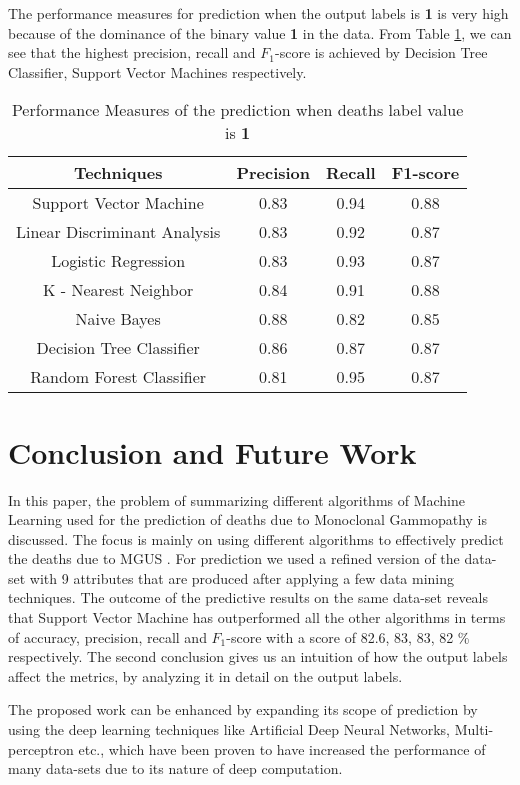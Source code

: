 \documentclass[conference]{IEEEtran}
\begin{document}
The performance measures for prediction when the output labels is \textbf{1} is very high because of the dominance of the binary value \textbf{1} in the data. From Table \ref{table:3}, we can see that the highest precision, recall and $F_1$-score is achieved by Decision Tree Classifier, Support Vector Machines respectively.
\begin{table}[H]
\centering
 \begin{tabular}{|c| c c c|}
 \hline
 Techniques  & Precision & Recall & F1-score \\ [0.5ex]
 \hline
 Support Vector Machine & 0.83 & 0.94 & 0.88 \\
 \hline
 Linear Discriminant Analysis & 0.83 & 0.92 & 0.87\\
 \hline
 Logistic Regression & 0.83 & 0.93 & 0.87\\
 \hline
 K - Nearest Neighbor & 0.84 & 0.91 & 0.88\\
 \hline
 Naive Bayes & 0.88 & 0.82 & 0.85\\
 \hline
 Decision Tree Classifier & 0.86 & 0.87 & 0.87 \\
 \hline
 Random Forest Classifier & 0.81 & 0.95 & 0.87  \\[0.75ex]
 \hline
\end{tabular}
\vspace*{0.25cm}
\caption{Performance Measures of the prediction when deaths label value is \textbf{1}}
\label{table:3}
\end{table}


\section{Conclusion and Future Work}
In this paper, the problem of summarizing different algorithms of Machine Learning used for the prediction of deaths due to Monoclonal Gammopathy is discussed. The focus is mainly on using different algorithms to effectively predict the deaths due to MGUS \cite{monoclonal1} . For prediction we used a refined version of the data-set with 9 attributes that are produced after applying a few data mining techniques. The outcome of the predictive results on the same data-set reveals that Support Vector Machine has outperformed all the other algorithms in terms   of accuracy, precision, recall and $F_1$-score with a score of 82.6, 83, 83, 82 \% respectively. The second conclusion gives us an intuition of how the output labels affect the metrics, by analyzing it in detail on the output labels.
\par
The proposed work can be enhanced by expanding its scope of prediction by using  the deep learning techniques \cite{dl,dl2}  like Artificial  Deep Neural Networks, Multi-perceptron etc.,
which have been proven to have increased the performance of many data-sets due to its nature of deep computation.





\end{document}
